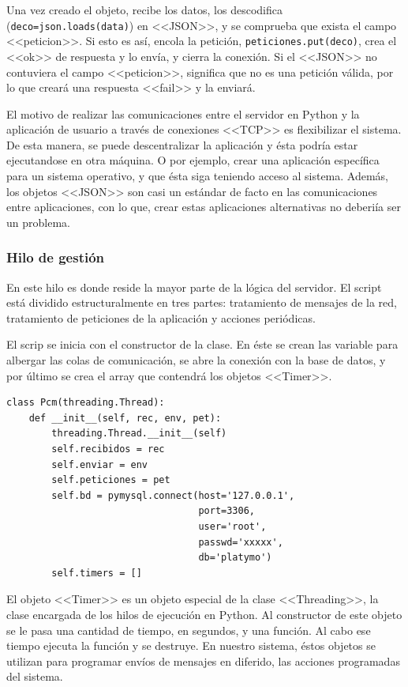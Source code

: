 Una vez creado el objeto, recibe los datos, los descodifica (\lstinline|deco=json.loads(data)|) en  <<JSON>>, y se comprueba que exista el campo <<peticion>>. Si esto es así, encola la petición, \lstinline|peticiones.put(deco)|, crea el <<ok>> de respuesta y lo envía, y cierra la conexión. Si el <<JSON>> no contuviera el campo <<peticion>>, significa que no es una petición válida, por lo que creará una respuesta <<fail>> y la enviará. 

El motivo de realizar las comunicaciones entre el servidor en Python y la aplicación de usuario a través de conexiones <<TCP>> es flexibilizar el sistema. De esta manera, se puede descentralizar la aplicación y ésta podría estar ejecutandose en otra máquina. O por ejemplo, crear una aplicación específica para un sistema operativo, y que ésta siga teniendo acceso al sistema. Además, los objetos <<JSON>> son casi un estándar de facto en las comunicaciones entre aplicaciones, con lo que, crear estas aplicaciones alternativas no deberiía ser un problema.


\subsubsection{Hilo de gestión}

En este hilo es donde reside la mayor parte de la lógica del servidor. El script está dividido estructuralmente en tres partes: tratamiento de mensajes de la red, tratamiento de peticiones de la aplicación y acciones periódicas.

El scrip se inicia con el constructor de la clase. En éste se crean las variable para albergar las colas de comunicación, se abre la conexión con la base de datos, y por último se crea el array que contendrá los objetos <<Timer>>.

\begin{lstlisting}
class Pcm(threading.Thread):
    def __init__(self, rec, env, pet):
        threading.Thread.__init__(self)
        self.recibidos = rec
        self.enviar = env
        self.peticiones = pet
        self.bd = pymysql.connect(host='127.0.0.1', 
                                  port=3306,
                                  user='root', 
                                  passwd='xxxxx', 
                                  db='platymo')
        self.timers = []
\end{lstlisting}

El objeto <<Timer>> es un objeto especial de la clase <<Threading>>, la clase encargada de los hilos de ejecución en Python. Al constructor de este objeto se le pasa una cantidad de tiempo, en segundos, y una función. Al cabo ese tiempo ejecuta la función y se destruye. En nuestro sistema, éstos objetos se utilizan para programar envíos de mensajes en diferido, las acciones programadas del sistema. 

